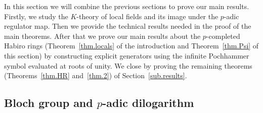 \documentclass[12pt,reqno]{amsart}
\theoremstyle{definition}
\begin{document}
In this section we will combine the previous sections to prove our main results.
Firstly, we study the $K$-theory of local fields and its
image under the $p$-adic regulator map. Then we provide the technical results
needed in the proof of the main theorems.
After that we prove our main results about the $p$-completed Habiro rings
(Theorem~\ref{thm.locals} of the introduction and Theorem~\ref{thm.Psi} of this
section) by constructing explicit generators using the infinite Pochhammer symbol
evaluated at roots of unity.
We close by proving the remaining theorems (Theorems~\ref{thm.HR} and~\ref{thm.2})
of Section~\ref{sub.results}.

\subsection{\texorpdfstring{Bloch group and $p$-adic dilogarithm}{Bloch
    group and p-adic dilogarithm}}
\label{sub.Dp}
\end{document}
